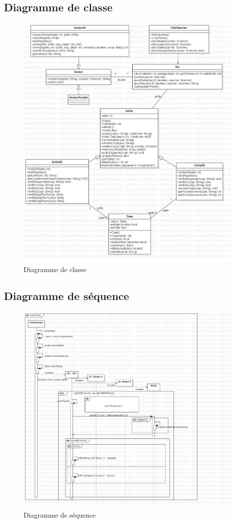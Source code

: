 \documentclass{article}
\begin{document}
\newpage
\subsection{Diagramme de classe}
\begin{figure}[h]
    \centering
    \includegraphics[scale=0.35]{Diagramme UML/Diagramme de classe.png}
    \caption{Diagramme de classe}
    \label{fig:Diagramme de classe}
\end{figure}

\newpage
\subsection{Diagramme de séquence}
\begin{figure}[h]
    \centering
    \includegraphics[scale=0.36]{Diagramme UML/Diagramme de sequence.png}
    \caption{Diagramme de séquence}
    \label{fig:Diagramme de séquence}
\end{figure}
\end{document}
